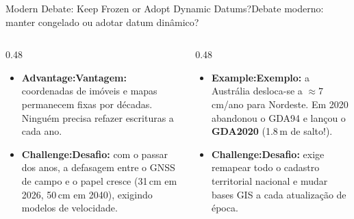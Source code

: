 \documentclass[aspectratio=169,11pt]{beamer}
\newcommand{\tr}[2]{\ifEN#2\else#1\fi}
\begin{document}
\begin{frame}{\tr{Debate moderno: manter congelado ou adotar datum dinâmico?}{Modern Debate: Keep Frozen or Adopt Dynamic Datums?}}
  \begin{columns}[onlytextwidth]
    \begin{column}{0.48\textwidth}
      \begin{tcolorbox}[colback=mTeal!8, colframe=mTeal, title={\tr{Modelo Estático (Brasil / SIRGAS)}{Static Frame (Brazil / SIRGAS)}}]
        \scriptsize
        \begin{itemize}
          \setlength{\itemsep}{2pt}
          \item \textbf{\tr{Vantagem:}{Advantage:}} coordenadas de imóveis e mapas permanecem fixas por décadas. Ninguém precisa refazer escrituras a cada ano.
          \item \textbf{\tr{Desafio:}{Challenge:}} com o passar dos anos, a defasagem entre o GNSS de campo e o papel cresce (\num{31}\,cm em 2026, \num{50}\,cm em 2040), exigindo modelos de velocidade.
        \end{itemize}
      \end{tcolorbox}
    \end{column}
    \begin{column}{0.48\textwidth}
      \begin{tcolorbox}[colback=mAmber!8, colframe=mAmber, title={\tr{Modelo Semi-Dinâmico (Austrália)}{Semi-Dynamic Frame (Australia)}}]
        \scriptsize
        \begin{itemize}
          \setlength{\itemsep}{2pt}
          \item \textbf{\tr{Exemplo:}{Example:}} a Austrália desloca-se a $\approx \num{7}$\,cm/ano para Nordeste. Em 2020 abandonou o GDA94 e lançou o \textbf{GDA2020} (\num{1.8}\,m de salto!).
          \item \textbf{\tr{Desafio:}{Challenge:}} exige remapear todo o cadastro territorial nacional e mudar bases GIS a cada atualização de época.
        \end{itemize}
      \end{tcolorbox}
    \end{column}
  \end{columns}
\end{frame}
\end{document}

